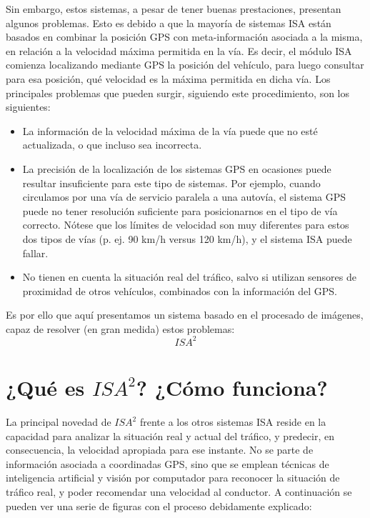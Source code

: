 Sin embargo, estos sistemas, a pesar de tener buenas prestaciones, presentan algunos problemas. Esto es debido a que la mayoría de sistemas \ac{ISA} están basados en combinar la posición \ac{GPS} con meta-información asociada a la misma, en relación a la velocidad máxima permitida en la vía. Es decir, el módulo ISA comienza localizando mediante GPS la posición del vehículo, para luego consultar para esa posición, qué velocidad es la máxima permitida en dicha vía. Los principales problemas que pueden surgir, siguiendo este procedimiento, son los siguientes:

\begin{itemize}
\item La información de la velocidad máxima de la vía puede que no esté actualizada, o que incluso sea incorrecta.
\item La precisión de la localización de los sistemas GPS en ocasiones puede resultar insuficiente para este tipo de sistemas. Por ejemplo, cuando circulamos por una vía de servicio paralela a una autovía, el sistema GPS puede no tener resolución suficiente para posicionarnos en el tipo de vía correcto. Nótese que los límites de velocidad son muy diferentes para estos dos tipos de vías (p. ej. 90 km/h versus 120 km/h), y el sistema ISA puede fallar.
\item No tienen en cuenta la situación real del tráfico, salvo si utilizan sensores de proximidad de otros vehículos, combinados con la información del GPS.
\end{itemize}


Es por ello que aquí presentamos un sistema basado en el procesado de imágenes, capaz de resolver (en gran medida) estos problemas: \[ISA^{2}\]


\section{¿Qué es $ISA^{2}$? ¿Cómo funciona?}


La principal novedad de $ISA^{2}$ frente a los otros sistemas \ac{ISA} reside en la capacidad para analizar la situación real y actual del tráfico, y predecir, en consecuencia, la velocidad apropiada para ese instante. No se parte de información asociada a coordinadas GPS, sino que se emplean técnicas de inteligencia artificial y visión por computador para reconocer la situación de tráfico real, y poder recomendar una velocidad al conductor. A continuación se pueden ver una serie de figuras con el proceso debidamente explicado:

